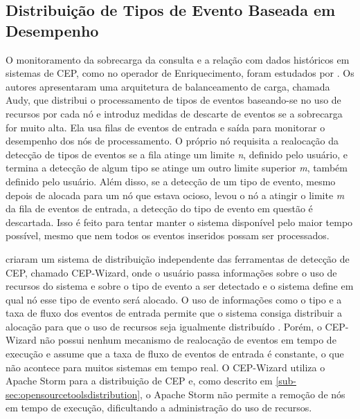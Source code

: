 \subsection{Distribuição de Tipos de Evento Baseada em Desempenho}
\label{sec:performanceBased}

O monitoramento da sobrecarga da consulta e a relação com dados históricos em sistemas de CEP, como no operador de Enriquecimento, foram estudados por \cite{6906776}. Os autores apresentaram uma arquitetura de balanceamento de carga, chamada Audy, que distribui o processamento de tipos de eventos baseando-se no uso de recursos por cada nó e introduz medidas de descarte de eventos se a sobrecarga for muito alta. Ela usa filas de eventos de entrada e saída para monitorar o desempenho dos nós de processamento. O próprio nó requisita a realocação da detecção de tipos de eventos se a fila atinge um limite \textit{n}, definido pelo usuário, e termina a detecção de algum tipo se atinge um outro limite superior \textit{m}, também definido pelo usuário. Além disso, se a detecção de um tipo de evento, mesmo depois de alocada para um nó que estava ocioso, levou o nó a atingir o limite \textit{m} da fila de eventos de entrada, a detecção do tipo de evento em questão é descartada. Isso é feito para tentar manter o sistema disponível pelo maior tempo possível, mesmo que nem todos os eventos inseridos possam ser processados. 

\cite{shin2019cep} criaram um sistema de distribuição independente das ferramentas de detecção de CEP, chamado CEP-Wizard, onde o usuário passa informações sobre o uso de recursos%
do sistema e sobre o tipo de evento a ser detectado e o sistema define em qual nó esse tipo de evento será alocado. O uso de informações como o tipo e a taxa de fluxo dos eventos de entrada permite que o sistema consiga distribuir a alocação  para que o uso de recursos seja igualmente distribuído%
. Porém, o CEP-Wizard não possui nenhum mecanismo de realocação de eventos em tempo de execução e assume que a taxa de fluxo de eventos de entrada é constante, o que não acontece para muitos sistemas em tempo real. O CEP-Wizard utiliza o Apache Storm para a distribuição de CEP e, como descrito em \ref{sub-sec:opensourcetoolsdistribution},
o Apache Storm não permite a remoção de nós em tempo de execução, dificultando a administração do uso de recursos.

